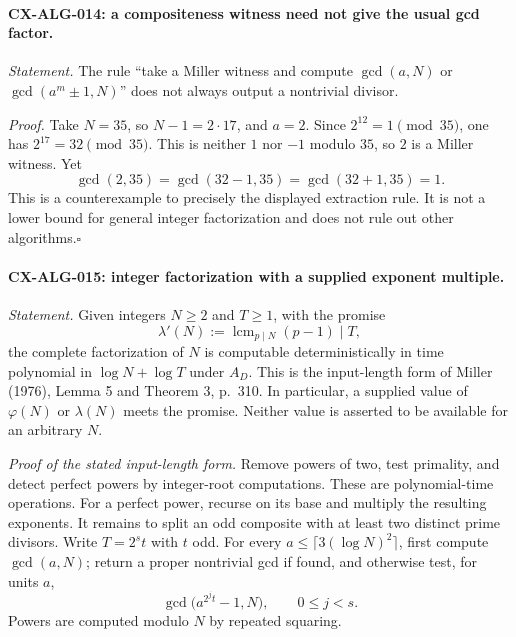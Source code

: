 \paragraph{CX-ALG-014: a compositeness witness need not give the usual gcd factor.}
\emph{Statement.} The rule ``take a Miller witness and compute
$\gcd(a,N)$ or $\gcd(a^m\pm1,N)$'' does not always output a nontrivial divisor.

\emph{Proof.} Take $N=35$, so $N-1=2\cdot17$, and $a=2$. Since
$2^{12}=1\pmod{35}$, one has $2^{17}=32\pmod{35}$. This is neither $1$ nor
$-1$ modulo $35$, so $2$ is a Miller witness. Yet
\[
 \gcd(2,35)=\gcd(32-1,35)=\gcd(32+1,35)=1.
\]
This is a counterexample to precisely the displayed extraction rule.
It is not a lower bound for general integer factorization and does not
rule out other algorithms.\hfill$\square$

\paragraph{CX-ALG-015: integer factorization with a supplied exponent multiple.}
\emph{Statement.} Given integers $N\ge2$ and $T\ge1$, with the promise
\[
       \lambda'(N):=\operatorname{lcm}_{p\mid N}(p-1)\mid T,
\]
the complete factorization of $N$ is computable deterministically in time
polynomial in $\log N+\log T$ under $A_D$. This is the input-length form
of Miller (1976), Lemma 5 and Theorem 3, p.~310. In particular, a supplied
value of $\varphi(N)$ or $\lambda(N)$ meets the promise. Neither value is
asserted to be available for an arbitrary $N$.

\emph{Proof of the stated input-length form.} Remove powers of two, test
primality, and detect perfect powers by integer-root computations. These
are polynomial-time operations. For a perfect power, recurse on its base
and multiply the resulting exponents. It remains to split an odd composite
with at least two distinct prime divisors. Write $T=2^s t$ with $t$ odd.
For every $a\leq\lceil3(\log N)^2\rceil$, first compute $\gcd(a,N)$;
return a proper nontrivial gcd if found, and otherwise test, for units $a$,
\[
             \gcd\bigl(a^{2^j t}-1,N\bigr),\qquad 0\leq j<s.
\]
Powers are computed modulo $N$ by repeated squaring.

